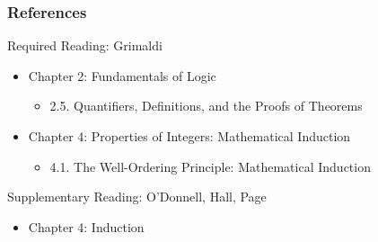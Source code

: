 \documentclass[dvipsnames]{beamer}
\begin{document}
\begin{frame}
  \frametitle{References}

  \begin{block}{Required Reading: Grimaldi}
    \begin{itemize}
      \item Chapter 2: Fundamentals of Logic
      \begin{itemize}
        \item 2.5. \alert{Quantifiers, Definitions, and the Proofs of Theorems}
      \end{itemize}

      \item Chapter 4: Properties of Integers: Mathematical Induction
      \begin{itemize}
        \item 4.1. \alert{The Well-Ordering Principle: Mathematical Induction}
      \end{itemize}
    \end{itemize}
  \end{block}

  \begin{block}{Supplementary Reading: O'Donnell, Hall, Page}
    \begin{itemize}
      \item Chapter 4: Induction
    \end{itemize}
  \end{block}
\end{frame}
\end{document}
